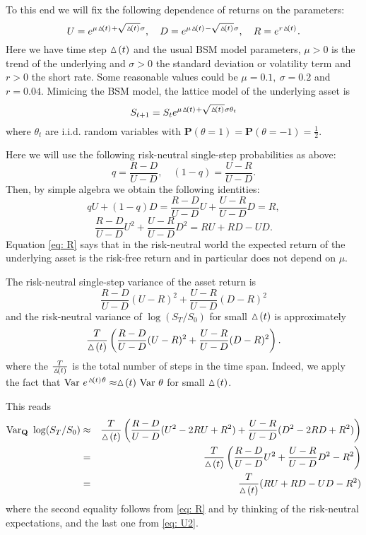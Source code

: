 \documentclass{amsart}
\theoremstyle{definition}
\theoremstyle{remark}
\numberwithin{equation}{section}
\renewcommand{\P}{\mathbf{P}}
\newcommand{\1}{\boldsymbol{1}}
\begin{document}
To this end we will fix the following dependence of returns on the parameters:
\[U = e^{\mu \t + \sqrt{\t}\sigma},\quad D = e^{\mu \t - \sqrt{\t}\sigma},\quad R=e^{r \t}.\]
Here we have time step $\ \!\! \vartriangle\! (t)\ \!\!$ and 
the usual BSM model parameters, $\mu>0$ is the trend of the underlying and $\sigma>0$ the standard deviation or volatility term and 
$r>0$ the short rate. Some reasonable values could be $\mu=0.1 ,\ \sigma=0.2$ and $r=0.04$.
Mimicing the BSM model, the lattice model of the underlying asset is 
\[S_{t+1} = S_t  e^{\mu \t + \sqrt{\t}\sigma \theta_t} \]
where $\theta_t$ are i.i.d. random variables with $\P(\theta=1)=\P(\theta=-1)=\frac{1}{2}$.
      
Here we will use the following risk-neutral single-step probabilities as above:
\[q=\frac{R-D}{U-D},\quad (1-q)=\frac{U-R}{U-D}.\]
Then, by simple algebra we obtain the following identities:
\begin{equation}\label{eq: R}
q U + (1-q) D =\frac{R-D}{U-D}U + \frac{U-R}{U-D}D  =R,
\end{equation}
\begin{equation}\label{eq: U2}
\frac{R-D}{U-D}U^2 + \frac{U-R}{U-D}D^2  = RU + RD -UD.
\end{equation}
Equation \eqref{eq: R} says that in the risk-neutral world the expected return of the underlying asset is the risk-free return and in particular
does not depend on $\mu$.

The risk-neutral single-step variance of the asset return is
\[\frac{R-D}{U-D}(U-R)^2 + \frac{U-R}{U-D}(D-R)^2 \] 
and the risk-neutral variance of $\log(S_T / S_0 )$ for small $\ \!\! \vartriangle\! (t)\ \!\!$ is approximately
\begin{equation}\label{eq: TVar}
\frac{T}{\ \!\! \vartriangle\! (t)\ \!\!} \left(\frac{R-D}{U-D}(U-R)^2 + \frac{U-R}{U-D}(D-R)^2 \right).
\end{equation}
where the $\frac{T}{\ \!\! \vartriangle\! (t)\ \!\!} $ is the total number of steps in the time span. Indeed, we apply the fact that 
$\mathrm{Var}\ e^{\t \theta} \approx \t\ \mathrm{Var}\ \theta$ for small $\ \!\! \vartriangle\! (t)\ \!\!$.

This reads
\begin{eqnarray*}
\mathrm{Var}_\mathbf{Q}\ \log(S_T / S_0 ) &\approx& \frac{T}{\t} \left(\frac{R-D}{U-D} (U^2 - 2RU + R^2 ) +  \frac{U-R}{U-D} (D^2 - 2RD + R^2 )  \right) \\
&=& \frac{T}{\t} \left(\frac{R-D}{U-D} U^2  +  \frac{U-R}{U-D} D^2  - R^2   \right) \\
&=& \frac{T}{\t} (RU + RD -UD - R^2 )
\end{eqnarray*}
where the second equality follows from \eqref{eq: R} and by thinking of the risk-neutral expectations, and the last one from \eqref{eq: U2}.
\end{document}
